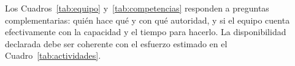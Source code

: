 Los Cuadros~\ref{tab:equipo} y~\ref{tab:competencias} responden a preguntas complementarias:
quién hace qué y con qué autoridad, y si el equipo cuenta efectivamente con la capacidad y el
tiempo para hacerlo. La disponibilidad declarada debe ser coherente con el esfuerzo estimado en
el Cuadro~\ref{tab:actividades}.
